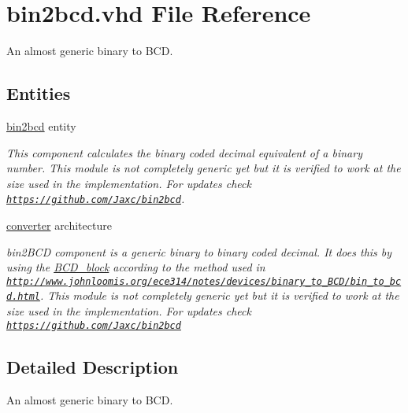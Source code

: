 \hypertarget{bin2bcd_8vhd}{\section{bin2bcd.\-vhd File Reference}
\label{bin2bcd_8vhd}
}


An almost generic binary to B\-C\-D.  


\subsection*{Entities}
\begin{DoxyCompactItemize}
\item 
\hyperlink{classbin2bcd}{bin2bcd} entity
\begin{DoxyCompactList}\small\item\em This component calculates the binary coded decimal equivalent of a binary number. This module is not completely generic yet but it is verified to work at the size used in the implementation. For updates check \href{https://github.com/Jaxc/bin2bcd}{\tt https\-://github.\-com/\-Jaxc/bin2bcd}. \end{DoxyCompactList}\item 
\hyperlink{classbin2bcd_1_1converter}{converter} architecture
\begin{DoxyCompactList}\small\item\em bin2\-B\-C\-D  component is a generic binary to binary coded decimal. It does this by using the \hyperlink{classBCD__block}{B\-C\-D\-\_\-block} according to the method used in \href{http://www.johnloomis.org/ece314/notes/devices/binary_to_BCD/bin_to_bcd.html}{\tt http\-://www.\-johnloomis.\-org/ece314/notes/devices/binary\-\_\-to\-\_\-\-B\-C\-D/bin\-\_\-to\-\_\-bcd.\-html}. This module is not completely generic yet but it is verified to work at the size used in the implementation. For updates check \href{https://github.com/Jaxc/bin2bcd}{\tt https\-://github.\-com/\-Jaxc/bin2bcd} \end{DoxyCompactList}\end{DoxyCompactItemize}


\subsection{Detailed Description}
An almost generic binary to B\-C\-D. 